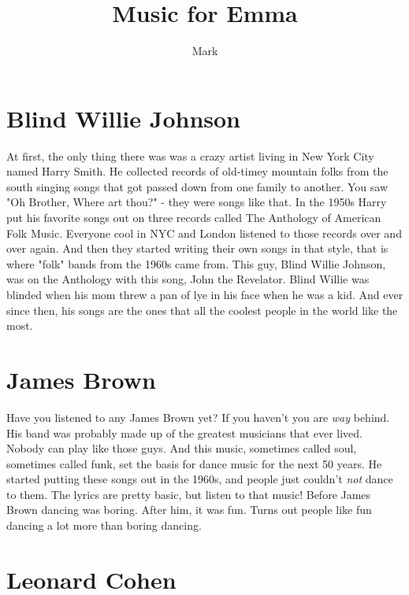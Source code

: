 \documentclass[letterpaper,12pt,single]{article}
\title{Music for Emma}
\author{Mark}
\begin{document}
 
\maketitle

\section{Blind Willie Johnson}

At first, the only thing there was was a crazy artist living in New York City named Harry Smith. He collected records of old-timey mountain folks from the south singing songs that got passed down from one family to another. You saw "Oh Brother, Where art thou?" - they were songs like that. In the 1950s Harry put his favorite songs out on three records called The Anthology of American Folk Music. Everyone cool in NYC and London listened to those records over and over again. And then they started writing their own songs in that style, that is where "folk" bands from the 1960s came from. This guy, Blind Willie Johnson, was on the Anthology with this song, John the Revelator. Blind Willie was blinded when his mom threw a pan of lye in his face when he was a kid. And ever since then, his songs are the ones that all the coolest people in the world like the most.

\section{James Brown}

Have you listened to any James Brown yet? If you haven't you are \emph{way} behind. His band was probably made up of the greatest musicians that ever lived. Nobody can play like those guys. And this music, sometimes called soul, sometimes called funk, set the basis for dance music for the next 50 years. He started putting these songs out in the 1960s, and people just couldn't \emph{not} dance to them. The lyrics are pretty basic, but listen to that music! Before James Brown dancing was boring. After him, it was fun. Turns out people like fun dancing a lot more than boring dancing.

\section{Leonard Cohen}
\end{document}
